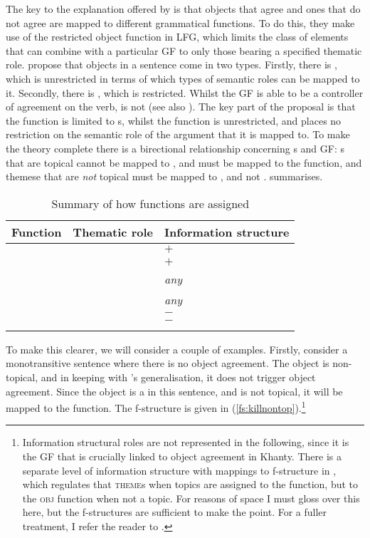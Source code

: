 \documentclass[output=paper
,modfonts
,nonflat]{langsci/langscibook}
\begin{document}
The key to the explanation offered by \citet{dn2011} is that objects that agree and ones that do not agree are mapped to different grammatical functions.
To do this, they make use of the restricted object function in LFG, which limits the class of elements that can combine with a particular GF to only those bearing a specified thematic role.
\citeauthor{dn2011} propose that objects in a sentence come in two types.
Firstly, there is \object, which is unrestricted in terms of which types of semantic roles can be mapped to it. Secondly, there is \robj, which is restricted.
Whilst the GF \object{} is able to be a controller of agreement on the verb, \robj{} is not (see also \citealt{buttking1996}).
The key part of the proposal is that the \robj{} function is limited to \theme s, whilst the \object{} function is unrestricted, and places no restriction on the semantic role of the argument that it is mapped to.
To make the theory complete there is a birectional relationship concerning \theme s and GF: \theme s that are topical cannot be mapped to \robj, and must be mapped to the \object{} function, and themese that are \emph{not} topical must be mapped to \robj, and not \object.
 summarises.

\begin{table}
	\caption{\label{tab:dntabsummary}Summary of how functions are assigned}
	\begin{tabular}{lll}
		\lsptoprule
		Function			&	Thematic role	&	Information structure\\
		\midrule
		\multirow{4}{*}{\object}	&	\theme{}		&	$+$\topic\\
		&	\patient{}		&	$+$\topic\\
		&	\goal			&	\emph{any}\\
		&	\causee		&	\emph{any}\\
		\midrule
		\multirow{2}{*}{\robj}	&	\theme		&	$-$\topic\\
		&	\patient		&	$-$\topic\\
		\lspbottomrule
	\end{tabular}
\end{table}

\noindent To make this clearer, we will consider a couple of examples. Firstly, consider a monotransitive sentence where there is no object agreement.
The object is non-topical, and in keeping with \citeauthor{dn2011}'s generalisation, it does not trigger object agreement.
Since the object is a \theme{} in this sentence, and is not topical, it will be mapped to the \robj{} function. The f-structure is given in (\ref{fs:killnontop}).\footnote{Information structural roles are not represented in the following, since it is the GF that is crucially linked to object agreement in Khanty.
There is a separate level of information structure with mappings to f-structure in \citet{dn2011}, which regulates that \textsc{theme}s when topics are assigned to the \robj{} function, but to the \textsc{obj} function when not a topic.
For reasons of space I must gloss over this here, but the f-structures are sufficient to make the point.
For a fuller treatment,  I refer the reader to \citet[][especially ch. 4]{dn2011}.}\largerpage[-1]
\end{document}
